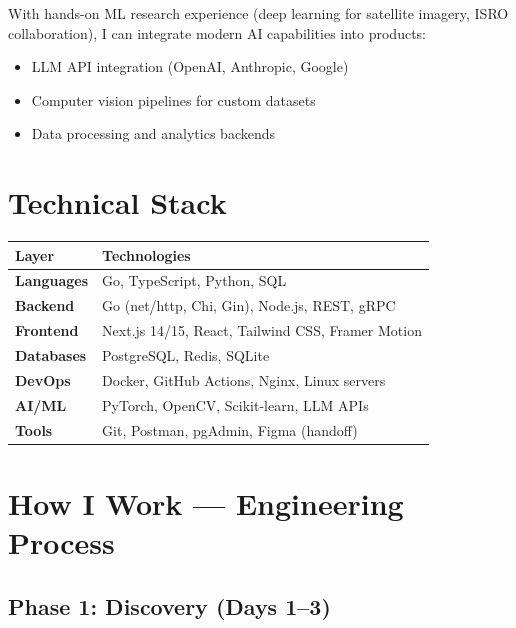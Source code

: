 \documentclass[11pt,a4paper]{article}
\begin{document}
With hands-on ML research experience (deep learning for satellite imagery, ISRO collaboration), I can integrate modern AI capabilities into products:

\begin{itemize}
  \item LLM API integration (OpenAI, Anthropic, Google)
  \item Computer vision pipelines for custom datasets
  \item Data processing and analytics backends
\end{itemize}

\section{Technical Stack}

\begin{tabularx}{\linewidth}{@{} l X @{}}
  \toprule
  \rowcolor{brand!8}
  \textbf{Layer} & \textbf{Technologies} \\
  \midrule
  \textbf{Languages}    & Go, TypeScript, Python, SQL \\
  \addlinespace[0.2em]
  \textbf{Backend}      & Go (net/http, Chi, Gin), Node.js, REST, gRPC \\
  \addlinespace[0.2em]
  \textbf{Frontend}     & Next.js 14/15, React, Tailwind CSS, Framer Motion \\
  \addlinespace[0.2em]
  \textbf{Databases}    & PostgreSQL, Redis, SQLite \\
  \addlinespace[0.2em]
  \textbf{DevOps}       & Docker, GitHub Actions, Nginx, Linux servers \\
  \addlinespace[0.2em]
  \textbf{AI/ML}        & PyTorch, OpenCV, Scikit-learn, LLM APIs \\
  \addlinespace[0.2em]
  \textbf{Tools}        & Git, Postman, pgAdmin, Figma (handoff) \\
  \bottomrule
\end{tabularx}

\section{How I Work — Engineering Process}

\subsection{Phase 1: Discovery (Days 1--3)}
\end{document}
